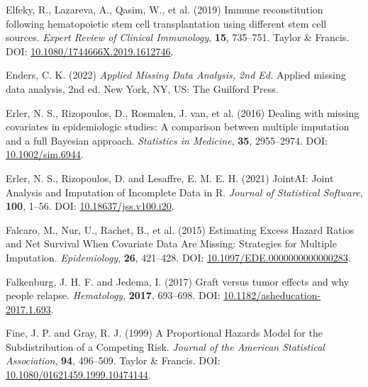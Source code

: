 \documentclass[
  letterpaper,
  DIV=11,
  numbers=noendperiod]{scrreprt}
\newlength{\cslhangindent}
\newlength{\cslentryspacingunit} %
\newenvironment{CSLReferences}[2] %
 {%
  \setlength{\parindent}{0pt}
  \ifodd #1
  \let\oldpar\par
  \def\par{\hangindent=\cslhangindent\oldpar}
  \fi
  \setlength{\parskip}{#2\cslentryspacingunit}
 }%
 {}
\begin{document}
\begin{CSLReferences}{1}{0}
\leavevmode{}%
Elfeky, R., Lazareva, A., Qasim, W., et al. (2019) Immune reconstitution
following hematopoietic stem cell transplantation using different stem
cell sources. \emph{Expert Review of Clinical Immunology}, \textbf{15},
735--751. Taylor \& Francis. DOI:
\href{https://doi.org/10.1080/1744666X.2019.1612746}{10.1080/1744666X.2019.1612746}.

\leavevmode{}%
Enders, C. K. (2022) \emph{Applied Missing Data Analysis, 2nd Ed.}
Applied missing data analysis, 2nd ed. New York, NY, US: The Guilford
Press.

\leavevmode{}%
Erler, N. S., Rizopoulos, D., Rosmalen, J. van, et al. (2016) Dealing
with missing covariates in epidemiologic studies: A comparison between
multiple imputation and a full {Bayesian} approach. \emph{Statistics in
Medicine}, \textbf{35}, 2955--2974. DOI:
\href{https://doi.org/10.1002/sim.6944}{10.1002/sim.6944}.

\leavevmode{}%
Erler, N. S., Rizopoulos, D. and Lesaffre, E. M. E. H. (2021) {JointAI}:
{Joint Analysis} and {Imputation} of {Incomplete Data} in {R}.
\emph{Journal of Statistical Software}, \textbf{100}, 1--56. DOI:
\href{https://doi.org/10.18637/jss.v100.i20}{10.18637/jss.v100.i20}.

\leavevmode{}%
Falcaro, M., Nur, U., Rachet, B., et al. (2015) Estimating {Excess
Hazard Ratios} and {Net Survival When Covariate Data Are Missing}:
{Strategies} for {Multiple Imputation}. \emph{Epidemiology},
\textbf{26}, 421--428. DOI:
\href{https://doi.org/10.1097/EDE.0000000000000283}{10.1097/EDE.0000000000000283}.

\leavevmode{}%
Falkenburg, J. H. F. and Jedema, I. (2017) Graft versus tumor effects
and why people relapse. \emph{Hematology}, \textbf{2017}, 693--698. DOI:
\href{https://doi.org/10.1182/asheducation-2017.1.693}{10.1182/asheducation-2017.1.693}.

\leavevmode{}%
Fine, J. P. and Gray, R. J. (1999) A {Proportional Hazards Model} for
the {Subdistribution} of a {Competing Risk}. \emph{Journal of the
American Statistical Association}, \textbf{94}, 496--509. Taylor \&
Francis. DOI:
\href{https://doi.org/10.1080/01621459.1999.10474144}{10.1080/01621459.1999.10474144}.


\end{CSLReferences}
\end{document}
